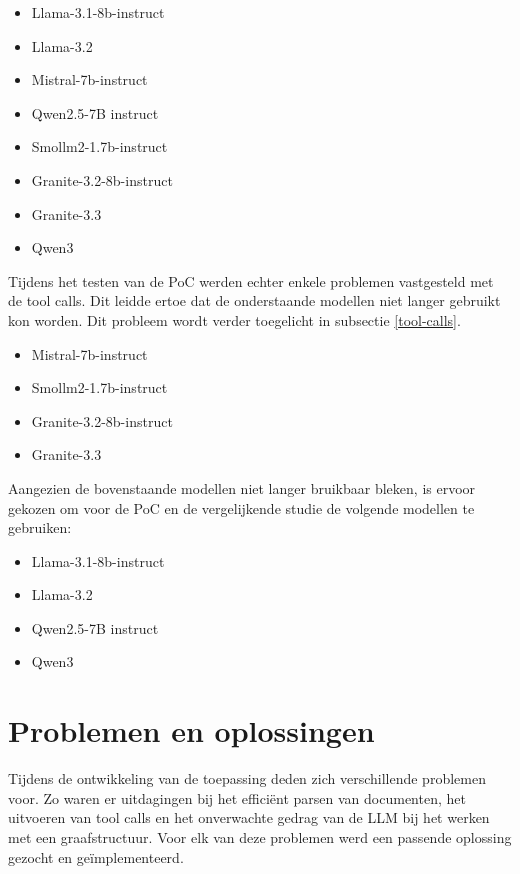 \begin{itemize}
    \item Llama-3.1-8b-instruct
    \item Llama-3.2
    \item Mistral-7b-instruct
    \item Qwen2.5-7B instruct
    \item Smollm2-1.7b-instruct
    \item Granite-3.2-8b-instruct
    \item Granite-3.3
    \item Qwen3
\end{itemize}

Tijdens het testen van de PoC werden echter enkele problemen vastgesteld met de tool calls. Dit leidde ertoe dat de onderstaande modellen niet langer gebruikt kon worden. Dit probleem wordt verder toegelicht in subsectie \ref{tool-calls}.

\begin{itemize}
    \item Mistral-7b-instruct
    \item Smollm2-1.7b-instruct
    \item Granite-3.2-8b-instruct
    \item Granite-3.3
\end{itemize}

Aangezien de bovenstaande modellen niet langer bruikbaar bleken, is ervoor gekozen om voor de PoC en de vergelijkende studie de volgende modellen te gebruiken:

\begin{itemize}
    \item Llama-3.1-8b-instruct
    \item Llama-3.2
    \item Qwen2.5-7B instruct
    \item Qwen3
\end{itemize}


\section{Problemen en oplossingen}

Tijdens de ontwikkeling van de toepassing deden zich verschillende problemen voor. Zo waren er uitdagingen bij het efficiënt parsen van documenten, het uitvoeren van tool calls en het onverwachte gedrag van de LLM bij het werken met een graafstructuur. Voor elk van deze problemen werd een passende oplossing gezocht en geïmplementeerd.

